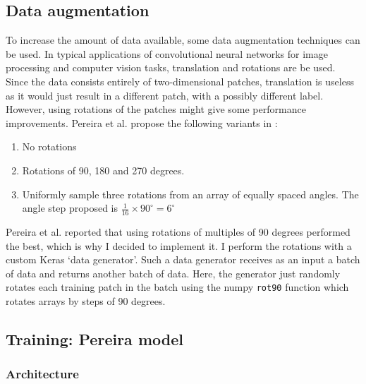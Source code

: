 \documentclass[12pt,a4paper,twoside,openright]{report}
\begin{document}
\subsection{Data augmentation}
To increase the amount of data available, some data augmentation techniques can be used. In typical applications of convolutional neural networks for image processing and computer vision tasks, translation and rotations are be used. Since the data consists entirely of two-dimensional patches, translation is useless as it would just result in a different patch, with a possibly different label. However, using rotations of the patches might give some performance improvements. Pereira et al. propose the following variants in \cite{pereira}:
\begin{enumerate}
	\item No rotations
	\item Rotations of 90, 180 and 270 degrees.
	\item Uniformly sample three rotations from an array of equally spaced angles. The angle step proposed is $\frac{1}{16} \times 90^{\circ} = 6^{\circ}$
\end{enumerate}
Pereira et al. reported that using rotations of multiples of 90 degrees performed the best, which is why I decided to implement it. I perform the rotations with a custom Keras `data generator'. Such a data generator receives as an input a batch of data and returns another batch of data. Here, the generator just randomly rotates each training patch in the batch using the numpy \texttt{rot90} function which rotates arrays by steps of 90 degrees.

\subsection{Training: Pereira model}

\subsubsection{Architecture}
\end{document}
